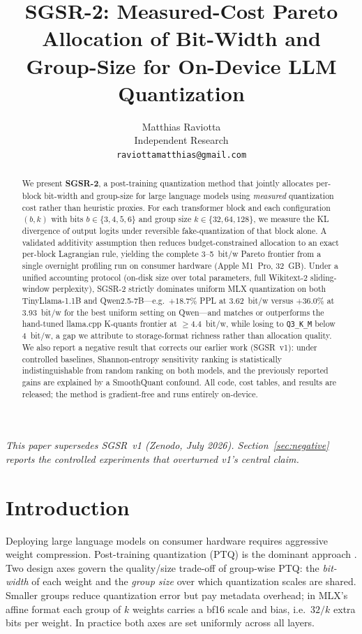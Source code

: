 \documentclass{article}
\title{SGSR-2: Measured-Cost Pareto Allocation of Bit-Width and\\
Group-Size for On-Device LLM Quantization}
\author{
  Matthias Raviotta \\
  Independent Research \\
  \texttt{raviottamatthias@gmail.com}
}
\begin{document}
\maketitle

\begin{abstract}
We present \textbf{SGSR-2}, a post-training quantization method that jointly
allocates per-block bit-width and group-size for large language models using
\emph{measured} quantization cost rather than heuristic proxies. For each
transformer block and each configuration $(b, k)$ with bits
$b\in\{3,4,5,6\}$ and group size $k\in\{32,64,128\}$, we measure the KL
divergence of output logits under reversible fake-quantization of that block
alone. A validated additivity assumption then reduces budget-constrained
allocation to an exact per-block Lagrangian rule, yielding the complete
3--5~bit/w Pareto frontier from a single overnight profiling run on consumer
hardware (Apple M1~Pro, 32~GB). Under a unified accounting protocol
(on-disk size over total parameters, full Wikitext-2 sliding-window
perplexity), SGSR-2 strictly dominates uniform MLX quantization on both
TinyLlama-1.1B and Qwen2.5-7B---e.g.\ $+18.7\%$ PPL at 3.62~bit/w versus
$+36.0\%$ at 3.93~bit/w for the best uniform setting on Qwen---and matches or
outperforms the hand-tuned llama.cpp K-quants frontier at
$\geq\!4.4$~bit/w, while losing to \texttt{Q3\_K\_M} below 4~bit/w, a gap we
attribute to storage-format richness rather than allocation quality. We also
report a negative result that corrects our earlier work (SGSR~v1): under
controlled baselines, Shannon-entropy sensitivity ranking is statistically
indistinguishable from random ranking on both models, and the previously
reported gains are explained by a SmoothQuant confound. All code, cost
tables, and results are released; the method is gradient-free and runs
entirely on-device.
\end{abstract}

\vspace{0.5em}
\noindent\textit{This paper supersedes SGSR~v1 (Zenodo, July 2026). Section~\ref{sec:negative}
reports the controlled experiments that overturned v1's central claim.}

\section{Introduction}

Deploying large language models on consumer hardware requires aggressive
weight compression. Post-training quantization (PTQ) is the dominant
approach \citep{gptq, llmint8}. Two design axes govern the quality/size
trade-off of group-wise PTQ: the \emph{bit-width} of each weight and the
\emph{group size} over which quantization scales are shared. Smaller groups
reduce quantization error but pay metadata overhead; in MLX's affine format
each group of $k$ weights carries a bf16 scale and bias, i.e.\
$32/k$ extra bits per weight. In practice both axes are set uniformly
across all layers.
\end{document}
